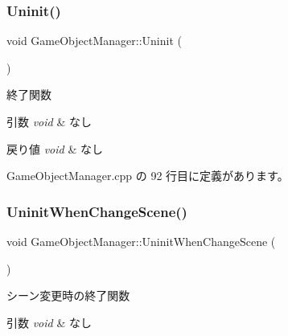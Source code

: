 \mbox{\label{class_game_object_manager_a4d2cb0e07fddeea160e64f6e1d2a326a}} 
\subsubsection{\texorpdfstring{Uninit()}{Uninit()}}
{\footnotesize\ttfamily void Game\+Object\+Manager\+::\+Uninit (\begin{DoxyParamCaption}{ }\end{DoxyParamCaption})}



終了関数 


\begin{DoxyParams}{引数}
{\em void} & なし \\
\hline
\end{DoxyParams}

\begin{DoxyRetVals}{戻り値}
{\em void} & なし \\
\hline
\end{DoxyRetVals}


 Game\+Object\+Manager.\+cpp の 92 行目に定義があります。

\mbox{\label{class_game_object_manager_ad962739b2c2f54d4160c3513132930da}} 
\subsubsection{\texorpdfstring{Uninit\+When\+Change\+Scene()}{UninitWhenChangeScene()}}
{\footnotesize\ttfamily void Game\+Object\+Manager\+::\+Uninit\+When\+Change\+Scene (\begin{DoxyParamCaption}{ }\end{DoxyParamCaption})}



シーン変更時の終了関数 


\begin{DoxyParams}{引数}
{\em void} & なし \\
\hline
\end{DoxyParams}

